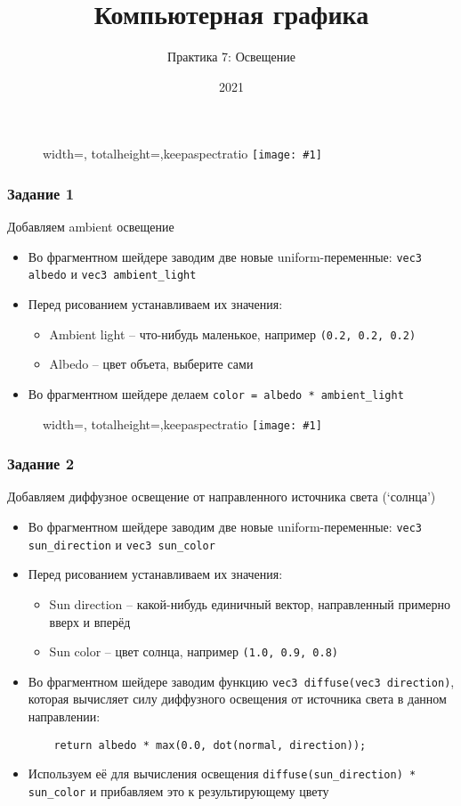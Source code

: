 \documentclass{beamer}
\title{Компьютерная графика}
\subtitle{Практика 7: Освещение}
\date{2021}
\newcommand{\slideimage}[1]{
  \begin{figure}
    \begin{adjustbox}{width=\textwidth, totalheight=\textheight-2\baselineskip-2\baselineskip,keepaspectratio}
      \texttt{[image: \#1]}
    \end{adjustbox}
  \end{figure}
}
\begin{document}
\frame{\titlepage}

\begin{frame}[fragile]
\slideimage{0.png}
\end{frame}

\begin{frame}[fragile]
\frametitle{Задание 1}
Добавляем ambient освещение
\begin{itemize}
\item Во фрагментном шейдере заводим две новые uniform-переменные: \verb|vec3 albedo| и \verb|vec3 ambient_light|
\item Перед рисованием устанавливаем их значения:
\begin{itemize}
\item Ambient light -- что-нибудь маленькое, например \verb|(0.2, 0.2, 0.2)|
\item Albedo -- цвет объета, выберите сами
\end{itemize}
\item Во фрагментном шейдере делаем \verb|color = albedo * ambient_light|
\end{itemize}
\end{frame}

\begin{frame}[fragile]
\slideimage{1.png}
\end{frame}

\begin{frame}[fragile]
\frametitle{Задание 2}
Добавляем диффузное освещение от направленного источника света (`солнца')
\begin{itemize}
\item Во фрагментном шейдере заводим две новые uniform-переменные: \verb|vec3 sun_direction| и \verb|vec3 sun_color|
\item Перед рисованием устанавливаем их значения:
\begin{itemize}
\item Sun direction -- какой-нибудь единичный вектор, направленный примерно вверх и вперёд
\item Sun color -- цвет солнца, например \verb|(1.0, 0.9, 0.8)|
\end{itemize}
\item Во фрагментном шейдере заводим функцию \verb|vec3 diffuse(vec3 direction)|, которая вычисляет силу диффузного освещения от источника света в данном направлении:
\begin{verbatim}
    return albedo * max(0.0, dot(normal, direction));
\end{verbatim}
\item Используем её для вычисления освещения \verb|diffuse(sun_direction) * sun_color| и прибавляем это к результирующему цвету
\end{itemize}
\end{frame}
\end{document}
